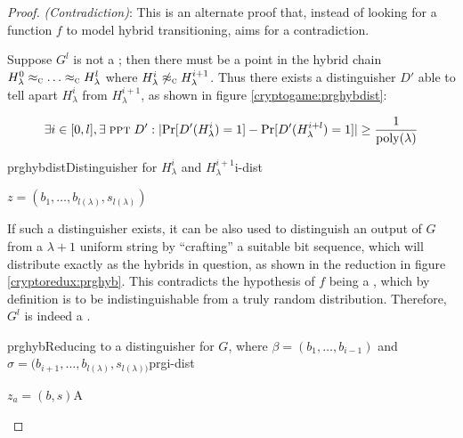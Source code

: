 \begin{proof}
    \textit{(Contradiction)}: This is an alternate proof that, instead of looking for a function $f$ to model hybrid transitioning, aims for a contradiction.
    
    Suppose $G^{l}$ is not a \prg; then there must be a point in the hybrid chain $H_{\lambda}^{0} \compindist \dots \compindist H_{\lambda}^{l}$ where $H_{\lambda}^{i} \not\approx_\textsc{c} H_{\lambda}^{i+1}$. Thus there exists a distinguisher $D'$ able to tell apart $H_{\lambda}^{i}$ from $H_{\lambda}^{i+1}$, as shown in figure \ref{cryptogame:prghybdist}:

    \begin{equation*}
        \exists i \in [0,l], \exists\; \textsc{ppt}\; D' : \lvert\Pr[D'(H_{\lambda}^{i}) = 1] - \Pr[D'(H_{\lambda}^{i+l}) = 1]\rvert \geq \frac{1}{\mathrm{poly}{(\lambda)}}
    \end{equation*}

    \begin{cryptogame}{prghybdist}{Distinguisher for $H_{\lambda}^{i}$ and $H_{\lambda}^{i+1}$}{i-dist}

        {$z = (b_{1}, \dots ,b_{l(\lambda)}, s_{l(\lambda)})$}{}

        \seqdelay
        

    \end{cryptogame}

    If such a distinguisher exists, it can be also used to distinguish an output of $G$ from a $\lambda+1$ uniform string by ``crafting'' a suitable bit sequence, which will distribute exactly as the hybrids in question, as shown in the reduction in figure \ref{cryptoredux:prghyb}. This contradicts the hypothesis of $f$ being a \prg, which by definition is to be indistinguishable from a truly random distribution. Therefore, $G^l$ is indeed a \prg.

    \begin{cryptoredux}{prghyb}{Reducing to a distinguisher for $G$, where $\beta = (b_1, \dots, b_{i-1})$ and $\sigma = (b_{i+1}, \dots, b_{l(\lambda)}, s_{l(\lambda))}$}{prg}{i-dist}

        {$z_a = (b, s)$}{A}{}


\end{cryptoredux}
\end{proof}
